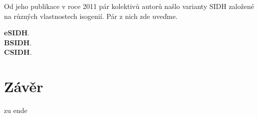 \documentclass [12pt]{report}
\begin{document}
Od jeho publikace v roce 2011 pár kolektivů autorů našlo varianty SIDH založené na různých vlastnostech isogenií. Pár z nich zde uveďme.

\textbf{eSIDH}.\\

\textbf{BSIDH}.\\

\textbf{CSIDH}.\\




\chapter*{Závěr}
zu ende


\end{document}
